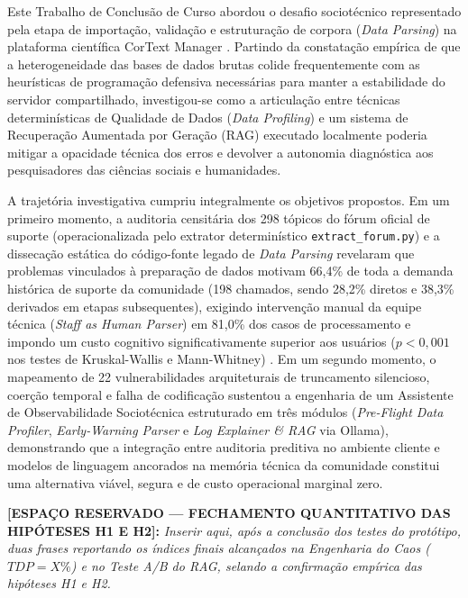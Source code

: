\documentclass[
	oneside,
	a4paper,
	12pt,
	chapter=TITLE,
	section=TITLE,
	english,
	brazilian
]{abntex2}
\begin{document}
Este Trabalho de Conclusão de Curso abordou o desafio sociotécnico representado pela etapa de importação, validação e estruturação de corpora (\textit{Data Parsing}) na plataforma científica CorText Manager \cite{CorText2026}. Partindo da constatação empírica de que a heterogeneidade das bases de dados brutas colide frequentemente com as heurísticas de programação defensiva necessárias para manter a estabilidade do servidor compartilhado, investigou-se como a articulação entre técnicas determinísticas de Qualidade de Dados (\textit{Data Profiling}) \cite{Wang1996,Naumann2014} e um sistema de Recuperação Aumentada por Geração (RAG) \cite{Lewis2020,Gao2023} executado localmente poderia mitigar a opacidade técnica dos erros e devolver a autonomia diagnóstica aos pesquisadores das ciências sociais e humanidades.

A trajetória investigativa cumpriu integralmente os objetivos propostos. Em um primeiro momento, a auditoria censitária dos 298 tópicos do fórum oficial de suporte (operacionalizada pelo extrator determinístico \texttt{extract\_\allowbreak forum.\allowbreak py}) e a dissecação estática do código-fonte legado de \textit{Data Parsing} revelaram que problemas vinculados à preparação de dados motivam 66,4\% de toda a demanda histórica de suporte da comunidade (198 chamados, sendo 28,2\% diretos e 38,3\% derivados em etapas subsequentes), exigindo intervenção manual da equipe técnica (\textit{Staff as Human Parser}) em 81,0\% dos casos de processamento e impondo um custo cognitivo significativamente superior aos usuários ($p < 0,001$ nos testes de Kruskal-Wallis e Mann-Whitney) \cite{Kruskal1952,Mann1947}. Em um segundo momento, o mapeamento de 22 vulnerabilidades arquiteturais de truncamento silencioso, coerção temporal e falha de codificação sustentou a engenharia de um Assistente de Observabilidade Sociotécnica estruturado em três módulos (\textit{Pre-Flight Data Profiler}, \textit{Early-Warning Parser} e \textit{Log Explainer \& RAG} via Ollama), demonstrando que a integração entre auditoria preditiva no ambiente cliente e modelos de linguagem ancorados na memória técnica da comunidade constitui uma alternativa viável, segura e de custo operacional marginal zero.

\begin{citacao}
\textbf{[ESPAÇO RESERVADO — FECHAMENTO QUANTITATIVO DAS HIPÓTESES H1 E H2]:} \textit{Inserir aqui, após a conclusão dos testes do protótipo, duas frases reportando os índices finais alcançados na Engenharia do Caos ($TDP = X\%$) e no Teste A/B do RAG, selando a confirmação empírica das hipóteses H1 e H2.}
\end{citacao}
\end{document}
